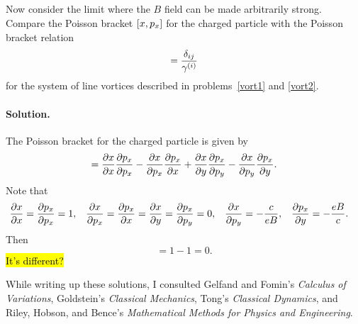 \documentclass[11pt]{article}
\newcommand{\beq}{\begin{equation*}}
\newcommand{\eeq}{\end{equation*}}
\newenvironment{problem}
{
	\subsection{}
	\color{darkgray}
    \ignorespaces
}
{

}
\newenvironment{solution}
{
    \paragraph{Solution.}
    \ignorespaces
}
{
    \bigskip
}
\begin{document}
\begin{problem}
	Now consider the limit where the $B$ field can be made arbitrarily strong.  Compare the Poisson bracket $[x, p_x]$ for the charged particle with the Poisson bracket relation
	\beq
		[\xi, \yi] = \frac{\delta_{ij}}{\gami}
	\eeq
	for the system of line vortices described in problems~\ref{vort1} and \ref{vort2}.
\end{problem}

\begin{solution}
	The Poisson bracket for the charged particle is given by
	\beq
		[x, \px] = \pdv{x}{x} \pdv{\px}{\px} - \pdv{x}{\px} \pdv{\px}{x} + \pdv{x}{y} \pdv{\px}{\py} - \pdv{x}{\py} \pdv{\px}{y}.
	\eeq
	Note that
	\begin{align*}
		\pdv{x}{x} &= \pdv{p_x}{p_x} = 1, &
		\pdv{x}{p_x} &= \pdv{p_x}{x} = \pdv{x}{y} = \pdv{p_x}{p_y} = 0, &
		\pdv{x}{p_y} &= -\frac{c}{e B}, &
		\pdv{p_x}{y} &= -\frac{e B}{c}.
	\end{align*}
	Then
	\beq
		[x, \px] = 1 - 1 = 0.
	\eeq
	\hl{It's different?}
\end{solution}


\vfill
While writing up these solutions, I consulted Gelfand and Fomin's \emph{Calculus of Variations}, Goldstein's \emph{Classical Mechanics}, Tong's \emph{Classical Dynamics}, and Riley, Hobson, and Bence's \emph{Mathematical Methods for Physics and Engineering}.
\end{document}
